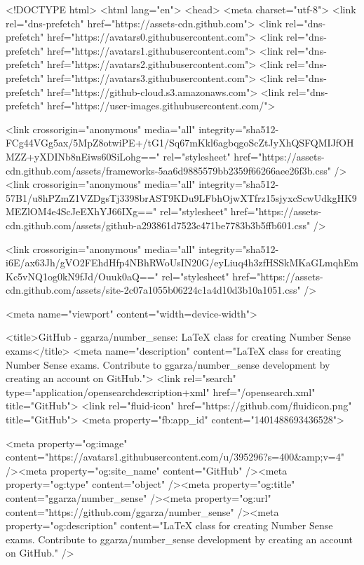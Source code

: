 





<!DOCTYPE html>
<html lang="en">
  <head>
    <meta charset="utf-8">
  <link rel="dns-prefetch" href="https://assets-cdn.github.com">
  <link rel="dns-prefetch" href="https://avatars0.githubusercontent.com">
  <link rel="dns-prefetch" href="https://avatars1.githubusercontent.com">
  <link rel="dns-prefetch" href="https://avatars2.githubusercontent.com">
  <link rel="dns-prefetch" href="https://avatars3.githubusercontent.com">
  <link rel="dns-prefetch" href="https://github-cloud.s3.amazonaws.com">
  <link rel="dns-prefetch" href="https://user-images.githubusercontent.com/">



  <link crossorigin="anonymous" media="all" integrity="sha512-FCg44VGg5ax/5MpZ8otwiPE+/tG1/Sq67mKkl6agbqgoScZtJyXhQSFQMIJfOHMZZ+yXDINb8nEiws60SiLohg==" rel="stylesheet" href="https://assets-cdn.github.com/assets/frameworks-5aa6d9885579bb2359f66266aee26f3b.css" />
  <link crossorigin="anonymous" media="all" integrity="sha512-57B1/u8hPZmZ1VZDgsTj3398brAST9KDu9LFbhOjwXTfrz15sjyxcScwUdkgHK9MEZlOM4e4ScJeEXhYJ66IXg==" rel="stylesheet" href="https://assets-cdn.github.com/assets/github-a293861d7523c471be7783b3b5ffb601.css" />
  
  
  <link crossorigin="anonymous" media="all" integrity="sha512-i6E/ax63Jh/gVO2FEhdHfp4NBhRWoUsIN20G/eyLiuq4h3zfHSSkMKaGLmqhEmKc5vNQ1og0kN9fJd/Ouuk0aQ==" rel="stylesheet" href="https://assets-cdn.github.com/assets/site-2c07a1055b06224c1a4d10d3b10a1051.css" />
  

  <meta name="viewport" content="width=device-width">
  
  <title>GitHub - ggarza/number_sense: LaTeX class for creating Number Sense exams</title>
    <meta name="description" content="LaTeX class for creating Number Sense exams. Contribute to ggarza/number_sense development by creating an account on GitHub.">
    <link rel="search" type="application/opensearchdescription+xml" href="/opensearch.xml" title="GitHub">
  <link rel="fluid-icon" href="https://github.com/fluidicon.png" title="GitHub">
  <meta property="fb:app_id" content="1401488693436528">

    
    <meta property="og:image" content="https://avatars1.githubusercontent.com/u/395296?s=400&amp;v=4" /><meta property="og:site_name" content="GitHub" /><meta property="og:type" content="object" /><meta property="og:title" content="ggarza/number_sense" /><meta property="og:url" content="https://github.com/ggarza/number_sense" /><meta property="og:description" content="LaTeX class for creating Number Sense exams. Contribute to ggarza/number_sense development by creating an account on GitHub." />

